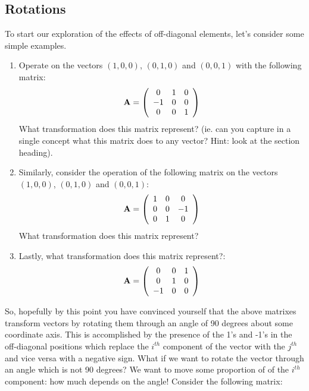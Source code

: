 \documentclass{tufte-handout}
\begin{document}
\subsection{Rotations} To start our exploration of the effects of off-diagonal elements, let's consider some simple examples.
\begin{enumerate}[resume]
\item  Operate on the vectors $(1,0,0)$, $(0,1,0)$ and $(0,0,1)$ with the following matrix:
\begin{equation}
{\bf A} = \left( \begin{array}{ccc}
   0 & 1 & 0 \\
   -1 & 0 & 0 \\
   0 & 0 & 1
 \end{array} \right)
\end{equation}
What transformation does this matrix represent? (ie. can you capture in a single concept what this matrix does to any vector?  Hint:  look at the section heading).
\item  Similarly, consider the operation of the following matrix on the vectors $(1,0,0)$, $(0,1,0)$ and $(0,0,1)$:
\begin{equation}
{\bf A} = \left( \begin{array}{ccc}
   1 & 0 & 0 \\
   0 & 0 & -1 \\
   0 & 1 & 0
 \end{array} \right)
\end{equation}
What transformation does this matrix represent?
\item  Lastly, what transformation does this matrix represent?:
\begin{equation}
{\bf A} = \left( \begin{array}{ccc}
   0 & 0 & 1 \\
   0 & 1 & 0 \\
   -1 & 0 & 0
 \end{array} \right)
\end{equation}
\end{enumerate}
So, hopefully by this point you have convinced yourself that the above matrixes transform vectors by rotating them through an angle of 90 degrees about some coordinate axis.  This is accomplished by the presence of the 1's and -1's in the off-diagonal positions which replace the $i^{th}$ component of the vector with the $j^{th}$ and vice versa with a negative sign.  What if we want to rotate the vector through an angle which is not 90 degrees?  We want to move some proportion of of the $i^{th}$ component:  how much depends on the angle!  Consider the following matrix:
\end{document}
